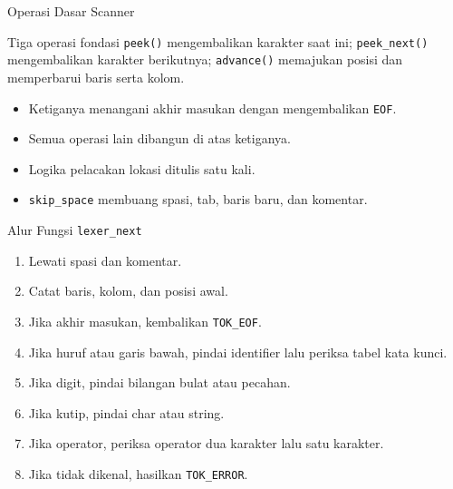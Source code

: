 \documentclass[aspectratio=169,10pt,t]{beamer}
\begin{document}
\begin{frame}{Operasi Dasar Scanner}
  \begin{block}{Tiga operasi fondasi}
    \small
    \texttt{peek()} mengembalikan karakter saat ini;
    \texttt{peek\_next()} mengembalikan karakter berikutnya;
    \texttt{advance()} memajukan posisi dan memperbarui baris serta
    kolom.
  \end{block}

  \begin{itemize}
    \item Ketiganya menangani akhir masukan dengan mengembalikan
          \texttt{EOF}.
    \item Semua operasi lain dibangun di atas ketiganya.
    \item Logika pelacakan lokasi ditulis satu kali.
    \item \texttt{skip\_space} membuang spasi, tab, baris baru, dan
          komentar.
  \end{itemize}
\end{frame}

\begin{frame}{Alur Fungsi \texttt{lexer\_next}}
  \begin{enumerate}
    \setlength{\itemsep}{1.5pt}
    \item Lewati spasi dan komentar.
    \item Catat baris, kolom, dan posisi awal.
    \item Jika akhir masukan, kembalikan \texttt{TOK\_EOF}.
    \item Jika huruf atau garis bawah, pindai identifier lalu periksa
          tabel kata kunci.
    \item Jika digit, pindai bilangan bulat atau pecahan.
    \item Jika kutip, pindai char atau string.
    \item Jika operator, periksa operator dua karakter lalu satu
          karakter.
    \item Jika tidak dikenal, hasilkan \texttt{TOK\_ERROR}.
  \end{enumerate}
\end{frame}
\end{document}
